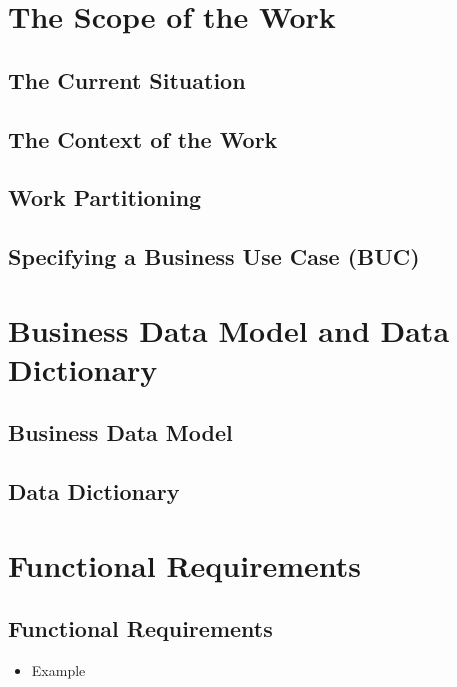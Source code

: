 \documentclass[12pt]{article}
\begin{document}
\section{The Scope of the Work}
  \subsection{The Current Situation}
  \subsection{The Context of the Work}
  \subsection{Work Partitioning}
  \subsection{Specifying a Business Use Case (BUC)}

\section{Business Data Model and Data Dictionary}
  \subsection{Business Data Model}
  \subsection{Data Dictionary}

\section{Functional Requirements}
  \subsection{Functional Requirements}
    \begin{itemize}
        \item Example
    \end{itemize}
\end{document}
